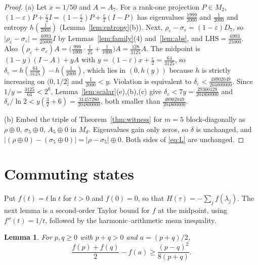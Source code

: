 \documentclass[11pt]{amsart}
\newtheorem{lemma}[theorem]{Lemma}
\theoremstyle{definition}\newtheorem{definition}[theorem]{Definition}
\theoremstyle{remark}\newtheorem{remark}[theorem]{Remark}
\newcommand{\abs}[1]{\lvert #1\rvert}
\newcommand{\LHS}{\mathrm{LHS}}
\begin{document}
\begin{proof}
(a) Let \(x=1/50\) and \(A=A_7\). For a rank-one projection \(P\in M_2\), \((1-\varepsilon)P+\frac{\varepsilon}{2}I=(1-\frac{\varepsilon}{2})P+\frac{\varepsilon}{2}(I-P)\) has eigenvalues \(\frac{1999}{2000}\) and \(\frac{1}{2000}\) and entropy \(h(\frac{1}{2000})\) (Lemma~\ref{lem:entropy}(b)). Next, \(\rho_\varepsilon-\sigma_\varepsilon=(1-\varepsilon)D_7\), so \(\abs{\rho_\varepsilon-\sigma_\varepsilon}=\frac{6993}{25000}I\) by Lemmas~\ref{lem:family}(4) and~\ref{lem:abs}, and \(\LHS=\frac{6993}{25000}\). Also \((\rho_\varepsilon+\sigma_\varepsilon)A=\bigl(\frac{999}{1000}\cdot\frac{1}{25}+\frac{1}{1000}\bigr)A=\frac{128}{3125}A\). The midpoint is \((1-y)(I-A)+yA\) with \(y=(1-\varepsilon)x+\frac{\varepsilon}{2}=\frac{64}{3125}\), so \(\delta_\varepsilon=h(\frac{64}{3125})-h(\frac{1}{2000})\), which lies in \((0,h(y))\) because \(h\) is strictly increasing on \((0,1/2]\) and \(\frac{1}{2000}<y\). Violation is equivalent to \(\delta_\varepsilon<\frac{48902049}{204800000}\). Since \(1/y=\frac{3125}{64}<2^6\), Lemma~\ref{lem:scalar}(e),(b),(c) give \(\delta_\varepsilon<7y=\frac{29360128}{204800000}\) and \(\delta_\varepsilon/\ln2<y(\frac32+6)=\frac{31457280}{204800000}\), both smaller than \(\frac{48902049}{204800000}\).

(b) Embed the triple of Theorem~\ref{thm:witness} for \(m=5\) block-diagonally as \(\rho\oplus0\), \(\sigma_5\oplus0\), \(A_5\oplus0\) in \(M_d\). Eigenvalues gain only zeros, so \(\delta\) is unchanged, and \(\abs{(\rho\oplus0)-(\sigma_5\oplus0)}=\abs{\rho-\sigma_5}\oplus0\). Both sides of \eqref{eq:L} are unchanged.
\end{proof}

\section{Commuting states}\label{sec:commuting}

Put \(f(t)=t\ln t\) for \(t>0\) and \(f(0)=0\), so that \(H(\tau)=-\sum_jf(\lambda_j)\). The next lemma is a second-order Taylor bound for \(f\) at the midpoint, using \(f''(t)=1/t\), followed by the harmonic--arithmetic mean inequality.

\begin{lemma}\label{lem:twopoint}
For \(p,q\ge0\) with \(p+q>0\) and \(a=(p+q)/2\),
\[
\frac{f(p)+f(q)}{2}-f(a)\ge\frac{(p-q)^2}{8(p+q)} .
\]
\end{lemma}
\end{document}

